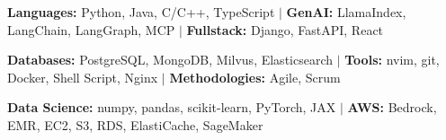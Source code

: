 \item\small{\textbf{Languages:} Python, Java, C/C++, TypeScript $|$ \textbf{GenAI:} LlamaIndex, LangChain, LangGraph, MCP $|$ \textbf{Fullstack:} Django, FastAPI, React}
\item\small{\textbf{Databases:} PostgreSQL, MongoDB, Milvus, Elasticsearch $|$ \textbf{Tools:} nvim, git, Docker, Shell Script, Nginx $|$ \textbf{Methodologies:} Agile, Scrum}
\item\small{\textbf{Data Science:} numpy, pandas, scikit-learn, PyTorch, JAX $|$ \textbf{AWS:} Bedrock, EMR, EC2, S3, RDS, ElastiCache, SageMaker}%
